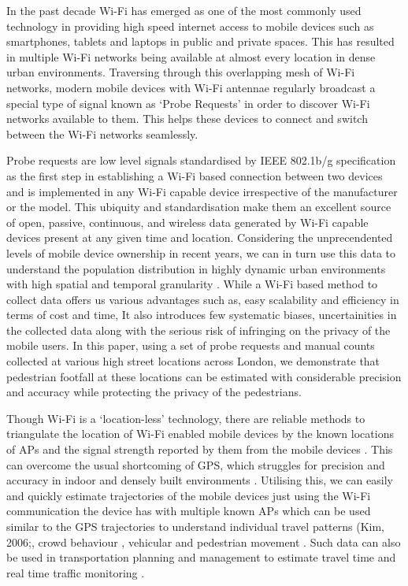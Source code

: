 In the past decade Wi-Fi has emerged as one of the most commonly used technology in providing high speed internet access to mobile devices such as smartphones, tablets and laptops in public and private spaces.
This has resulted in multiple Wi-Fi networks being available at almost every location in dense urban environments. 
Traversing through this overlapping mesh of Wi-Fi networks, modern mobile devices with Wi-Fi antennae regularly broadcast a special type of signal known as `Probe Requests' in order to discover Wi-Fi networks available to them.
This helps these devices to connect and switch between the Wi-Fi networks seamlessly.

Probe requests are low level signals standardised by IEEE 802.1b/g specification \citep{ieee2013} as the first step in establishing a Wi-Fi based connection between two devices and is implemented in any Wi-Fi capable device irrespective of the manufacturer or the model.
This ubiquity and standardisation make them an excellent source of open, passive, continuous, and wireless data generated by Wi-Fi capable devices present at any given time and location.
Considering the unprecendented levels of mobile device ownership in recent years, we can in turn use this data to understand the population distribution in highly dynamic urban environments with high spatial and temporal granularity \citep{freud2015,konto2017}. While a Wi-Fi based method to collect data offers us various advantages such as, easy scalability and efficiency in terms of cost and time, It also introduces few systematic biases, uncertainities in the collected data along with the serious risk of infringing on the privacy of the mobile users.
In this paper, using a set of probe requests and manual counts collected at various high street locations across London, we demonstrate that pedestrian footfall at these locations can be estimated with considerable precision and accuracy while protecting the privacy of the pedestrians.

Though Wi-Fi is a `location-less' technology, there are reliable methods to triangulate the location of Wi-Fi enabled mobile devices by the known locations of APs and the signal strength reported by them from the mobile devices \citep{he2003range, moore2004robust, lamarca2005place}.
This can overcome the usual shortcoming of GPS, which struggles for precision and accuracy in indoor and densely built environments \citep{zarim2006,kawaguchi2009wifi, xi2010locating}. 
Utilising this, we can easily and quickly estimate trajectories of the mobile devices just using the Wi-Fi communication the device has with multiple known APs \citep{Sorensenlocation} which can be used similar to the GPS trajectories to understand individual travel patterns (Kim, 2006;\citep{reki2007,Sap2015}, crowd behaviour \citep{abedi2013bluetooth,mowafi2013tracking}, vehicular \citep{lu2010vehicle} and pedestrian movement \citep{xu2013pedestrian,fukuzaki2014pedestrian,wang2016gait}.
Such data can also be used in transportation planning and management to estimate travel time \citep{musa2011wiflow} and real time traffic monitoring \citep{abbott2013empirical}.

